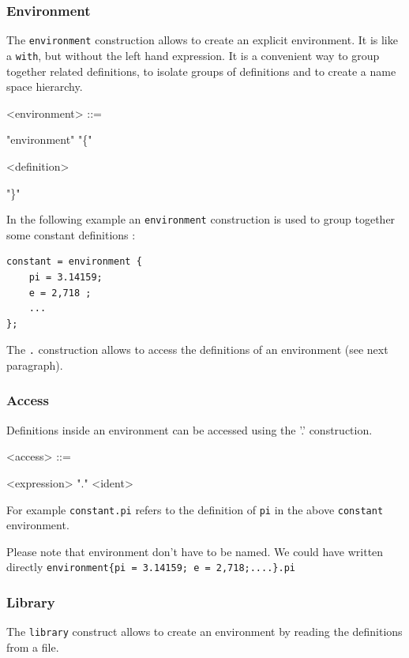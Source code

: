 \documentclass[a4paper,10pt]{book}
\begin{document}
\subsubsection{Environment} 

The \lstinline'environment' construction allows to create an explicit environment. It is like a \lstinline'with', but without the left hand expression. It is a convenient way to group together related definitions, to isolate groups of definitions and to create a name space hierarchy. 

\begin{grammar}
  <environment> ::= 
  \begin{syntdiag}
      "environment" "\{"
        \begin{rep}
          <definition>
        \end{rep}
        "\}"
  \end{syntdiag}
\end{grammar}

In the following example an \lstinline'environment' construction is used to group together some constant definitions :

\begin{lstlisting}
constant = environment {
	pi = 3.14159;
	e = 2,718 ;
	...
};
\end{lstlisting}
The  \lstinline'.' construction allows to access the definitions of an environment (see next paragraph).

\subsubsection{Access} 
Definitions inside an environment can be accessed using 
the '.' construction. 

\begin{grammar}
  <access> ::= 
  \begin{syntdiag}
      <expression> "." <ident>
  \end{syntdiag}
\end{grammar}

For example \lstinline'constant.pi' refers to the definition of \lstinline'pi' in the above \lstinline'constant' environment.

Please note that environment don't have to be named. We could have written directly 
\lstinline'environment{pi = 3.14159; e = 2,718;....}.pi'



\subsubsection{Library} 
The \lstinline'library' construct allows to create an environment by reading the definitions from a file.
\end{document}
